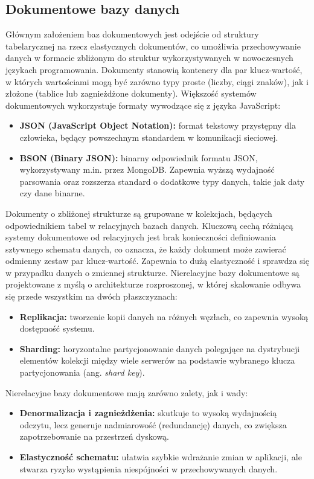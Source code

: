 \subsection{Dokumentowe bazy danych}
Głównym założeniem baz dokumentowych jest odejście od struktury tabelarycznej na rzecz elastycznych dokumentów, co umożliwia przechowywanie danych w formacie zbliżonym do struktur wykorzystywanych w nowoczesnych językach programowania. Dokumenty stanowią kontenery dla par klucz-wartość, w których wartościami mogą być zarówno typy proste (liczby, ciągi znaków), jak i złożone (tablice lub zagnieżdżone dokumenty). Większość systemów dokumentowych wykorzystuje formaty wywodzące się z języka JavaScript:
\begin{itemize}
    \item \textbf{JSON (JavaScript Object Notation):} format tekstowy przystępny dla człowieka, będący powszechnym standardem w komunikacji sieciowej.
    \item \textbf{BSON (Binary JSON):} binarny odpowiednik formatu JSON, wykorzystywany m.in. przez MongoDB. Zapewnia wyższą wydajność parsowania oraz rozszerza standard o dodatkowe typy danych, takie jak daty czy dane binarne.
\end{itemize}
Dokumenty o zbliżonej strukturze są grupowane w kolekcjach, będących odpowiednikiem tabel w relacyjnych bazach danych. Kluczową cechą różniącą systemy dokumentowe od relacyjnych jest brak konieczności definiowania sztywnego schematu danych, co oznacza, że każdy dokument może zawierać odmienny zestaw par klucz-wartość. Zapewnia to dużą elastyczność i sprawdza się w przypadku danych o zmiennej strukturze. Nierelacyjne bazy dokumentowe są projektowane z myślą o architekturze rozproszonej, w której skalowanie odbywa się przede wszystkim na dwóch płaszczyznach:
\begin{itemize}
    \item \textbf{Replikacja:} tworzenie kopii danych na różnych węzłach, co zapewnia wysoką dostępność systemu.
    \item \textbf{Sharding:} horyzontalne partycjonowanie danych polegające na dystrybucji elementów kolekcji między wiele serwerów na podstawie wybranego klucza partycjonowania (ang. \emph{shard key}).
\end{itemize}
Nierelacyjne bazy dokumentowe mają zarówno zalety, jak i wady:
\begin{itemize}
    \item \textbf{Denormalizacja i zagnieżdżenia:} skutkuje to wysoką wydajnością odczytu, lecz generuje nadmiarowość (redundancję) danych, co zwiększa zapotrzebowanie na przestrzeń dyskową.
    \item \textbf{Elastyczność schematu:} ułatwia szybkie wdrażanie zmian w aplikacji, ale stwarza ryzyko wystąpienia niespójności w przechowywanych danych.
\end{itemize}
